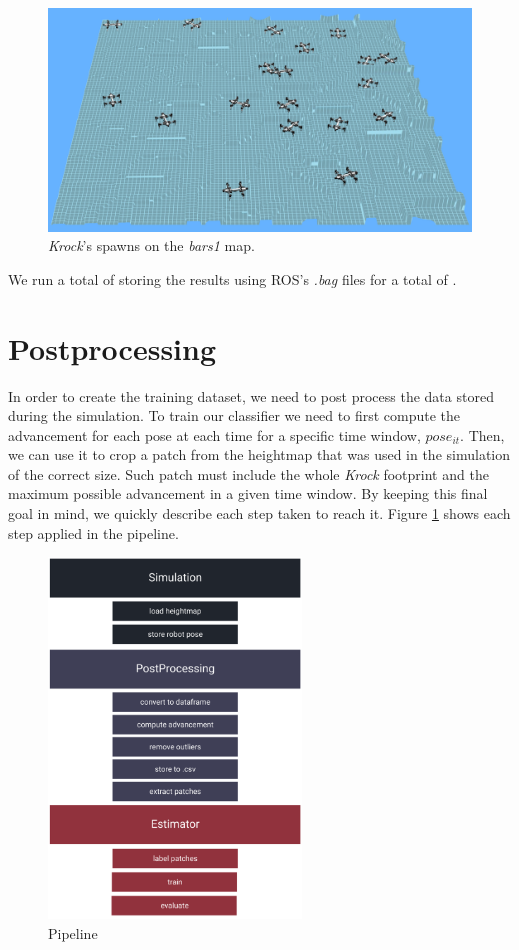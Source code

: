 \documentclass[../document.tex]{subfiles}
\begin{document}
\begin{figure}[H]
\centering
\includegraphics[width=\linewidth]{img/krock-spawn-20-bars1.png}
\caption{\emph{Krock}'s spawns on the \emph{bars1} map.}
\end{figure}
We run a total of  storing the results using ROS's \emph{.bag} files for a total of .
\section{Postprocessing}
In order to create the training dataset, we need to post process the data stored during the simulation. To train our classifier we need to first compute the advancement for each pose at each time for a specific time window, $pose_{it}$. Then, we can use it to crop a patch from the heightmap that was used in the simulation of the correct size. Such patch must include the whole \emph{Krock} footprint and the maximum possible advancement in a given time window. 
By keeping this final goal in mind, we quickly describe each step taken to reach it. Figure \ref{fig: pipeline} shows each step applied in the pipeline. 
\begin{figure}[H]
\centering
\includegraphics[width=0.6\textwidth]{img/pipeline}
\caption{Pipeline}
\label{fig: pipeline}
\end{figure}
\end{document}
